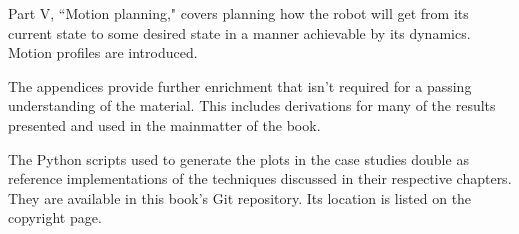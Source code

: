 Part V, ``Motion planning," covers planning how the robot will get from its
current state to some desired state in a manner achievable by its dynamics.
Motion profiles are introduced.

The appendices provide further enrichment that isn't required for a passing
understanding of the material. This includes derivations for many of the results
presented and used in the mainmatter of the book.

The Python scripts used to generate the plots in the case studies double as
reference implementations of the techniques discussed in their respective
chapters. They are available in this book's Git repository. Its location is
listed on the copyright page.
